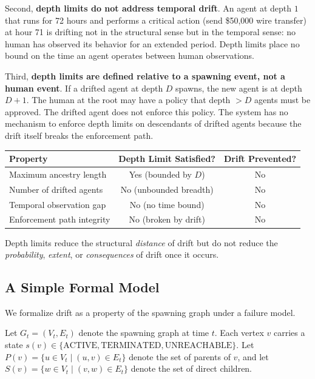 Second, \textbf{depth limits do not address temporal drift}. An agent at depth
$1$ that runs for 72 hours and performs a critical action (send \$50,000 wire
transfer) at hour 71 is drifting not in the structural sense but in the
temporal sense: no human has observed its behavior for an extended period. Depth
limits place no bound on the time an agent operates between human observations.

Third, \textbf{depth limits are defined relative to a spawning event, not a
human event}. If a drifted agent at depth $D$ spawns, the new agent is at depth
$D+1$. The human at the root may have a policy that depth $>D$ agents must be
approved. The drifted agent does not enforce this policy. The system has no
mechanism to enforce depth limits on descendants of drifted agents because the
drift itself breaks the enforcement path.

\begin{center}
\begin{tabular}{lcc}
\toprule
Property & Depth Limit Satisfied? & Drift Prevented? \\ \midrule
Maximum ancestry length & Yes (bounded by $D$) & No \\
Number of drifted agents & No (unbounded breadth) & No \\
Temporal observation gap & No (no time bound) & No \\
Enforcement path integrity & No (broken by drift) & No \\
\bottomrule
\end{tabular}
\end{center}

Depth limits reduce the structural \emph{distance} of drift but do not reduce
the \emph{probability}, \emph{extent}, or \emph{consequences} of drift once it
occurs.

\subsection{A Simple Formal Model}

We formalize drift as a property of the spawning graph under a failure model.

Let $G_t = (V_t, E_t)$ denote the spawning graph at time $t$. Each vertex $v$
carries a state $s(v) \in \{\text{ACTIVE}, \text{TERMINATED}, \text{UNREACHABLE}\}$.
Let $P(v) = \{u \in V_t \mid (u, v) \in E_t\}$ denote the set of parents of $v$,
and let $S(v) = \{w \in V_t \mid (v, w) \in E_t\}$ denote the set of direct
children.

